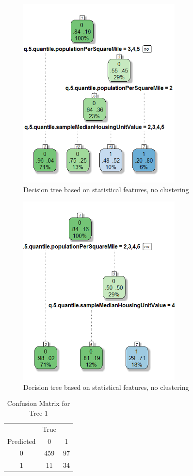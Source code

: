 \documentclass[conference,compsoc]{IEEEtran}
\begin{document}
\begin{figure}[!t]
\centering
\includegraphics[width=3.25in]{decision-tree-02-cluster-2.png}
\caption{Decision tree based on statistical features, no clustering}
\label{decision.tree.02.2}
\end{figure}

\begin{figure}[!t]
\centering
\includegraphics[width=3.25in]{decision-tree-02-cluster-3.png}
\caption{Decision tree based on statistical features, no clustering}
\label{decision.tree.02.3}
\end{figure}


\begin{table}[!t]
\renewcommand{\arraystretch}{1.3}
\caption{Confusion Matrix for Tree 1}
\label{table.confusion.matrix.01}
\centering
\begin{tabular}{ccc}
\hline
 & True &  \\
Predicted & 0 & 1 \\
0 & 459 & 97 \\
1 & 11 & 34 \\
\hline
\end{tabular}
\end{table}
\end{document}
